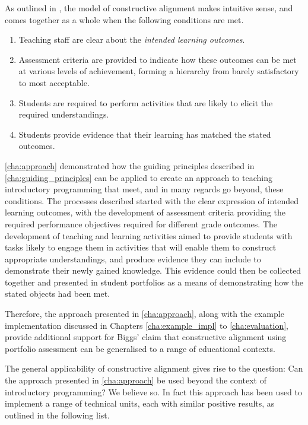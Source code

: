 As outlined in \cite{Biggs:1996c}, the model of constructive alignment makes intuitive sense, and comes together as a whole when the following conditions are met.
\begin{enumerate}
	\item Teaching staff are clear about the \emph{intended learning outcomes}.
	\item Assessment criteria are provided to indicate how these outcomes can be met at various levels of achievement, forming a hierarchy from barely satisfactory to most acceptable.
	\item Students are required to perform activities that are likely to elicit the required understandings.
	\item Students provide evidence that their learning has matched the stated outcomes.
\end{enumerate}

\cref{cha:approach} demonstrated how the guiding principles described in \cref{cha:guiding_principles} can be applied to create an approach to teaching introductory programming that meet, and in many regards go beyond, these conditions. The processes described started with the clear expression of intended learning outcomes, with the development of assessment criteria providing the required performance objectives required for different grade outcomes. The development of teaching and learning activities aimed to provide students with tasks likely to engage them in activities that will enable them to construct appropriate understandings, and produce evidence they can include to demonstrate their newly gained knowledge. This evidence could then be collected together and presented in student portfolios as a means of demonstrating how the stated objects had been met.

Therefore, the approach presented in \cref{cha:approach}, along with the example implementation discussed in Chapters \ref{cha:example_impl} to \ref{cha:evaluation}, provide additional support for Biggs' claim that constructive alignment using portfolio assessment can be generalised to a range of educational contexts. 

The general applicability of constructive alignment gives rise to the question: Can the approach presented in \cref{cha:approach} be used beyond the context of introductory programming? We believe so. In fact this approach has been used to implement a range of technical units, each with similar positive results, as outlined in the following list.

